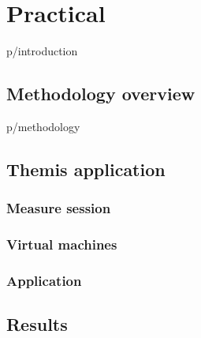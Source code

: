 \documentclass[12pt,oneside,a4paper]{report} %
\begin{document}
\part{Practical}
	{p/introduction}
	\chapter{Methodology overview}
	{p/methodology}

	\chapter{Themis application}
		\section{Measure session}
		\section{Virtual machines}
		\section{Application}
		


	\chapter{Results}

\printglossary[type=acronym,title=List of Abbreviations,toctitle=List of Abbreviations]

\newpage
{} \label{listoffig}
\listoffigures

\newpage
{} \label{listoftab}
\listoftables
\cleardoublepage

{}




\end{document}
